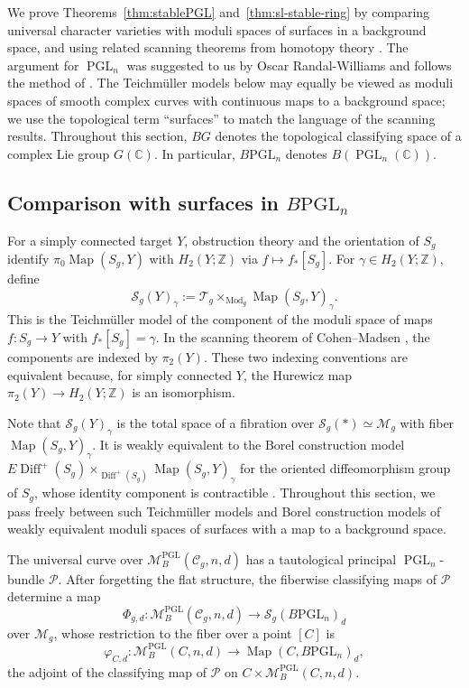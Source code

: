 \documentclass[11pt,reqno]{amsart}
\theoremstyle{plain} %
\theoremstyle{definition}
\newcommand{\CC}{\mathbb{C}}
\newcommand{\M}{\mathcal{M}}
\newcommand{\C}{\mathcal{C}}
\newcommand{\mc}{\mathcal}
\newcommand{\ZZ}{\mathbb{Z}}
\DeclareMathOperator{\Diff}{Diff}
\DeclareMathOperator{\PGL}{PGL}
\newcommand{\BPGL}{B\mathrm{PGL}}
\DeclareMathOperator{\Mod}{Mod}
\DeclareMathOperator{\Map}{Map}
\newcommand{\Sc}{\mathcal{S}}
\begin{document}
We prove Theorems~\ref{thm:stablePGL} and~\ref{thm:sl-stable-ring} by comparing universal character varieties with moduli spaces of surfaces in a background space, and using related scanning theorems from homotopy theory \cite{cohen2006surfaces,GMTW,GRW-monoids}. The argument for $\PGL_n$ was suggested to us by Oscar Randal-Williams and follows the method of \cite[Appendix~B]{Randal-Williams}. The Teichm\"uller models below may equally be viewed as moduli spaces of smooth complex curves with continuous maps to a background space; we use the topological term ``surfaces'' to match the language of the scanning results. Throughout this section, $BG$ denotes the topological classifying space of a complex Lie group $G(\CC)$. In particular, $\BPGL_n$ denotes $B(\PGL_n(\CC))$.

\subsection{Comparison with surfaces in $\BPGL_n$} \label{subsec: comparison maps}

For a simply connected target $Y$, obstruction theory and the orientation of $S_g$ identify $\pi_0\Map(S_g,Y)$ with $H_2(Y;\ZZ)$ via $f\mapsto f_*[S_g]$. For $\gamma\in H_2(Y;\ZZ)$, define
\[
\Sc_g(Y)_\gamma := \mc T_g \times_{\Mod_g} \Map(S_g,Y)_\gamma.
\]
This is the Teichm\"uller model of the component of the moduli space of maps $f\colon S_g\to Y$ with $f_*[S_g]=\gamma$. In the scanning theorem of Cohen--Madsen \cite{cohen2006surfaces}, the components are indexed by $\pi_2(Y)$. These two indexing conventions are equivalent because, for simply connected $Y$, the Hurewicz map $\pi_2(Y)\to H_2(Y;\ZZ)$ is an isomorphism.

Note that $\Sc_g(Y)_\gamma$ is the total space of a fibration over $\Sc_g(*)\simeq\M_g$ with fiber $\Map(S_g,Y)_\gamma$. It is weakly equivalent to the Borel construction model $E\Diff^+(S_g) \times_{\Diff^+(S_g)} \Map(S_g,Y)_\gamma$ for the oriented diffeomorphism group of $S_g$, whose identity component is contractible \cite{Earle-Eells}. Throughout this section, we pass freely between such Teichm\"uller models and Borel construction models of weakly equivalent moduli spaces of surfaces with a map to a background space.

The universal curve over $\M_B^{\PGL}(\C_g,n,d)$ has a tautological principal $\PGL_n$-bundle $\mc P$. After forgetting the flat structure, the fiberwise classifying maps of $\mc P$ determine a map
\[
\Phi_{g,d} \colon \M_B^{\PGL}(\C_g,n,d) \longrightarrow \Sc_g(\BPGL_n)_d
\]
over $\M_g$, whose restriction to the fiber over a point $[C]$ is
\[
\varphi_{C,d} \colon \M_B^{\PGL}(C,n,d) \longrightarrow \Map(C,\BPGL_n)_d,
\]
the adjoint of the classifying map of $\mc P$ on $C \times \M_B^{\PGL}(C,n,d)$.
\end{document}
